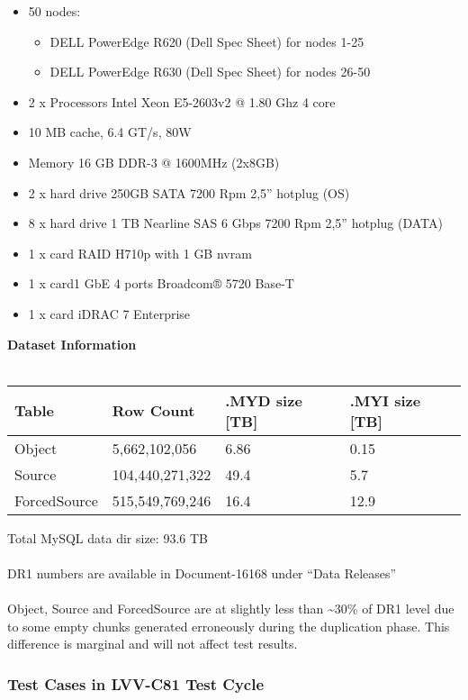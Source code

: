 \documentclass[DM,STR,toc]{lsstdoc}
\providecommand{\tightlist}{
  \setlength{\itemsep}{0pt}\setlength{\parskip}{0pt}}
\begin{document}
\begin{itemize}
\tightlist
\item
  50 nodes:

  \begin{itemize}
  \tightlist
  \item
    DELL PowerEdge R620 (Dell Spec Sheet) for nodes 1-25~
  \item
    DELL PowerEdge R630 (Dell Spec Sheet) for nodes 26-50
  \end{itemize}
\item
  2 x Processors Intel Xeon E5-2603v2 @ 1.80 Ghz 4 core
\item
  10 MB cache, 6.4 GT/s, 80W
\item
  Memory 16 GB DDR-3 @ 1600MHz (2x8GB)
\item
  2 x hard drive 250GB SATA 7200 Rpm 2,5'' hotplug (OS)
\item
  8 x hard drive 1 TB Nearline SAS 6 Gbps 7200 Rpm 2,5'' hotplug (DATA)
\item
  1 x card RAID H710p with 1 GB nvram
\item
  1 x card1 GbE 4 ports Broadcom® 5720 Base-T
\item
  1 x card iDRAC 7 Enterprise
\end{itemize}

\textbf{Dataset Information\\
}~\\

\begin{longtable}[]{@{}llll@{}}
\toprule
Table & Row Count & .MYD size {[}TB{]} & .MYI size
{[}TB{]}\tabularnewline
\midrule
\endhead
Object & 5,662,102,056 & 6.86 & 0.15\tabularnewline
Source & 104,440,271,322 & 49.4 & 5.7\tabularnewline
ForcedSource & 515,549,769,246 & 16.4 & 12.9\tabularnewline
\bottomrule
\end{longtable}

Total MySQL data dir size: 93.6 TB\\
~\\
DR1 numbers are available in Document-16168 under ``Data Releases''\\
~\\
Object, Source and ForcedSource are at slightly less than
\textasciitilde{}30\% of DR1 level due to some empty chunks generated
erroneously during the duplication phase. This difference is marginal
and will not affect test results.


  \subsubsection{Test Cases in LVV-C81 Test Cycle}
\end{document}
